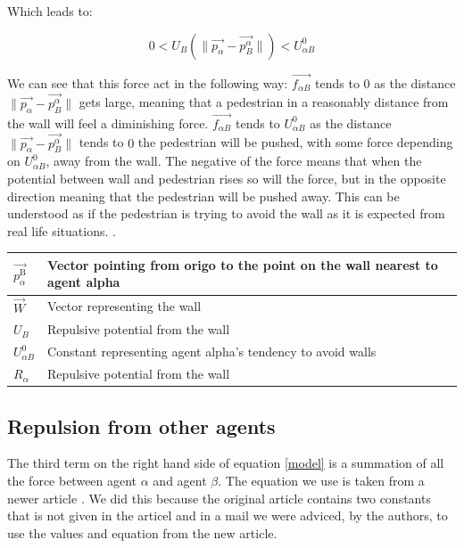 Which leads to:

\begin{equation}
0< U_{B} \left( \| \vec{p_{\alpha}} - \vec{p_{B}^{\alpha}} \| \right) < U^0_{\alpha B}
\end{equation}

We can see that this force act in the following way: $\vec{f_{\alpha B}}$ tends to 0 as the distance 
$\| \vec{p_{\alpha}} - \vec{p_{B}^{\alpha}} \|$ gets large, meaning that a pedestrian in a reasonably 
distance from the wall will feel a diminishing force. $\vec{f_{\alpha B}}$ tends to $U^0_{\alpha B}$ 
as the distance $ \| \vec{p_{\alpha}} - \vec{p_{B}^{\alpha}} \|$ tends to $0$ the pedestrian will be 
pushed, with some force depending on $U^0_{\alpha B}$, away from the wall. The negative of the force 
means that when the potential between wall and pedestrian rises so will the force, but in the opposite 
direction meaning that the pedestrian will be pushed away. This can be understood as if the pedestrian 
is trying to avoid the wall as it is expected from real life situations. \cite{social-force}. %

\begin{center}
\begin{tabular}{lll}
\hline
$\vec{p_{\alpha}^{\text{B}}}$& Vector pointing from origo to the point on the wall nearest to agent alpha &\\
\hline
$\vec{W}$& Vector representing the wall &\\
\hline
$U_{B}$ & Repulsive potential from the wall\\
\hline
$U^{0}_{\alpha B}$ & Constant representing agent alpha's tendency to avoid walls\\
\hline
$R_{\alpha}$& Repulsive potential from the wall\\
\hline
\end{tabular}
\end{center}

\subsection{Repulsion from other agents}
The third term on the right hand side of equation \eqref{model} is a summation of all the 
force between agent $\alpha$ and agent $\beta$. The equation we use is taken from a newer article \cite{ABconstant}. We did this because the original article contains two constants that is not given in the articel and in a mail we were adviced, by the authors, to use the values and equation from the new article. 

